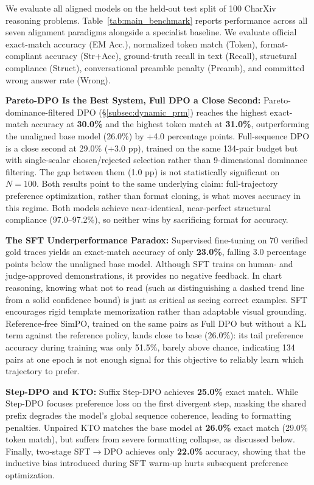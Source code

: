 \documentclass[11pt]{article}
\begin{document}
We evaluate all aligned models on the held-out test split of 100 CharXiv reasoning problems. Table~\ref{tab:main_benchmark} reports performance across all seven alignment paradigms alongside a specialist baseline. We evaluate official exact-match accuracy (EM Acc.), normalized token match (Token), format-compliant accuracy (Str+Acc), ground-truth recall in text (Recall), structural compliance (Struct), conversational preamble penalty (Preamb), and committed wrong answer rate (Wrong).

\textbf{Pareto-DPO Is the Best System, Full DPO a Close Second:} Pareto-dominance-filtered DPO (\S\ref{subsec:dynamic_prm}) reaches the highest exact-match accuracy at \textbf{30.0\%} and the highest token match at \textbf{31.0\%}, outperforming the unaligned base model (26.0\%) by +4.0 percentage points. Full-sequence DPO is a close second at 29.0\% (+3.0 pp), trained on the same 134-pair budget but with single-scalar chosen/rejected selection rather than 9-dimensional dominance filtering. The gap between them (1.0 pp) is not statistically significant on $N=100$. Both results point to the same underlying claim: full-trajectory preference optimization, rather than format cloning, is what moves accuracy in this regime. Both models achieve near-identical, near-perfect structural compliance (97.0--97.2\%), so neither wins by sacrificing format for accuracy.

\textbf{The SFT Underperformance Paradox:} Supervised fine-tuning on 70 verified gold traces yields an exact-match accuracy of only \textbf{23.0\%}, falling 3.0 percentage points below the unaligned base model. Although SFT trains on human- and judge-approved demonstrations, it provides no negative feedback. In chart reasoning, knowing what not to read (such as distinguishing a dashed trend line from a solid confidence bound) is just as critical as seeing correct examples. SFT encourages rigid template memorization rather than adaptable visual grounding. Reference-free SimPO, trained on the same pairs as Full DPO but without a KL term against the reference policy, lands close to base (26.0\%): its tail preference accuracy during training was only 51.5\%, barely above chance, indicating 134 pairs at one epoch is not enough signal for this objective to reliably learn which trajectory to prefer.

\textbf{Step-DPO and KTO:} Suffix Step-DPO achieves \textbf{25.0\%} exact match. While Step-DPO focuses preference loss on the first divergent step, masking the shared prefix degrades the model's global sequence coherence, leading to formatting penalties. Unpaired KTO matches the base model at \textbf{26.0\%} exact match (29.0\% token match), but suffers from severe formatting collapse, as discussed below. Finally, two-stage SFT$\rightarrow$DPO achieves only \textbf{22.0\%} accuracy, showing that the inductive bias introduced during SFT warm-up hurts subsequent preference optimization.
\end{document}
